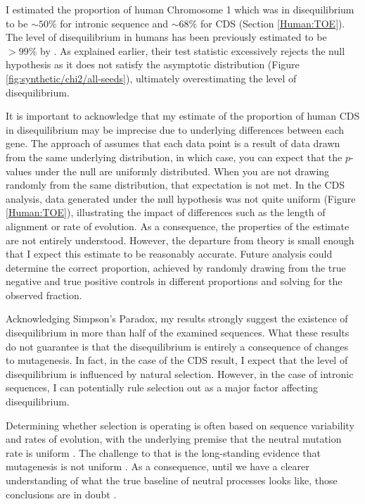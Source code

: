 I estimated the proportion of human Chromosome 1 which was in disequilibrium to be $\sim50\%$ for intronic sequence and $\sim68\%$ for CDS (Section \ref{Human:TOE}). The level of disequilibrium in humans has been previously estimated to be $>99\%$ by \cite{Squartini2008QuantifyingProcess}. As explained earlier, their test statistic excessively rejects the null hypothesis as it does not satisfy the asymptotic distribution (Figure \ref{fig:synthetic/chi2/all-seeds}), ultimately overestimating the level of disequilibrium. 

It is important to acknowledge that my estimate of the proportion of human CDS in disequilibrium may be imprecise due to underlying differences between each gene. The approach of \cite{Storey2003StatisticalStudies} assumes that each data point is a result of data drawn from the same underlying distribution, in which case, you can expect that the $p$-values under the null are uniformly distributed. When you are not drawing randomly from the same distribution, that expectation is not met. In the CDS analysis, data generated under the null hypothesis was not quite uniform (Figure \ref{Human:TOE}), illustrating the impact of differences such as the length of alignment or rate of evolution. As a consequence, the properties of the estimate are not entirely understood. However, the departure from theory is small enough that I expect this estimate to be reasonably accurate. Future analysis could determine the correct proportion, achieved by randomly drawing from the true negative and true positive controls in different proportions and solving for the observed fraction. 

Acknowledging Simpson's Paradox, my results strongly suggest the existence of disequilibrium in more than half of the examined sequences. What these results do not guarantee is that the disequilibrium is entirely a consequence of changes to mutagenesis. In fact, in the case of the CDS result, I expect that the level of disequilibrium is influenced by natural selection. However, in the case of intronic sequences, I can potentially rule selection out as a major factor affecting disequilibrium. 

Determining whether selection is operating is often based on sequence variability and rates of evolution, with the underlying premise that the neutral mutation rate is uniform \citep[for examples see][]{McVicker2009WidespreadEvolution, Vitti2013DetectingData}. The challenge to that is the long-standing evidence that mutagenesis is not uniform \citep{Wolfe1989MutationGenome}. As a consequence, until we have a clearer understanding of what the true baseline of neutral processes looks like, those conclusions are in doubt \citep{Graur2013OnENCODE, Kvikstad2014StrongGenome}. 

